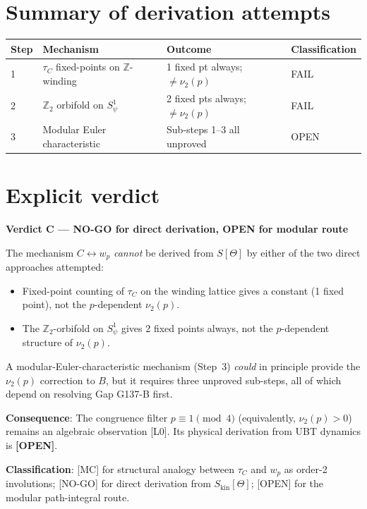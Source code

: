 \documentclass[12pt,a4paper]{article}
\begin{document}
\section{Summary of derivation attempts}

\begin{center}
\begin{tabular}{llll}
\toprule
Step & Mechanism & Outcome & Classification \\
\midrule
1 & $\tau_C$ fixed-points on $\mathbb{Z}$-winding & 1 fixed pt always; $\neq \nu_2(p)$ & FAIL \\
2 & $\mathbb{Z}_2$ orbifold on $S^1_\psi$ & 2 fixed pts always; $\neq \nu_2(p)$ & FAIL \\
3 & Modular Euler characteristic & Sub-steps 1–3 all unproved & OPEN \\
\bottomrule
\end{tabular}
\end{center}

\section{Explicit verdict}

\begin{verdictbox}
\textbf{Verdict C — NO-GO for direct derivation, OPEN for modular route}

The mechanism $C \leftrightarrow w_p$ \emph{cannot} be derived from $S[\Theta]$
by either of the two direct approaches attempted:
\begin{itemize}
  \item Fixed-point counting of $\tau_C$ on the winding lattice gives a constant
        (1 fixed point), not the $p$-dependent $\nu_2(p)$.
  \item The $\mathbb{Z}_2$-orbifold on $S^1_\psi$ gives 2 fixed points always,
        not the $p$-dependent structure of $\nu_2(p)$.
\end{itemize}

A modular-Euler-characteristic mechanism (Step~3) \emph{could} in principle
provide the $\nu_2(p)$ correction to $B$, but it requires three unproved
sub-steps, all of which depend on resolving Gap G137-B first.

\medskip
\noindent\textbf{Consequence}: The congruence filter $p \equiv 1 \pmod{4}$
(equivalently, $\nu_2(p) > 0$) remains an algebraic observation [L0].
Its physical derivation from UBT dynamics is \textbf{[OPEN]}.

\medskip
\noindent\textbf{Classification}: [MC] for structural analogy between
$\tau_C$ and $w_p$ as order-2 involutions; [NO-GO] for direct derivation
from $S_{\mathrm{kin}}[\Theta]$; [OPEN] for the modular path-integral route.
\end{verdictbox}
\end{document}
